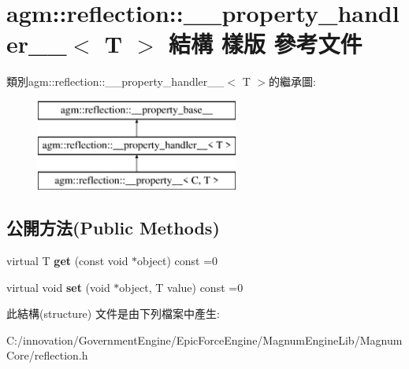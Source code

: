 \hypertarget{structagm_1_1reflection_1_1____property__handler____}{}\section{agm\+:\+:reflection\+:\+:\+\_\+\+\_\+property\+\_\+handler\+\_\+\+\_\+$<$ T $>$ 結構 樣版 參考文件}
\label{structagm_1_1reflection_1_1____property__handler____}
類別agm\+:\+:reflection\+:\+:\+\_\+\+\_\+property\+\_\+handler\+\_\+\+\_\+$<$ T $>$的繼承圖\+:\begin{figure}[H]
\begin{center}
\leavevmode
\includegraphics[height=3.000000cm]{structagm_1_1reflection_1_1____property__handler____}
\end{center}
\end{figure}
\subsection*{公開方法(Public Methods)}
\begin{DoxyCompactItemize}
\item 
virtual T {\bfseries get} (const void $\ast$object) const  =0\hypertarget{structagm_1_1reflection_1_1____property__handler_____afdd1f1c5c3ed851a885caaa1978a120d}{}\label{structagm_1_1reflection_1_1____property__handler_____afdd1f1c5c3ed851a885caaa1978a120d}

\item 
virtual void {\bfseries set} (void $\ast$object, T value) const  =0\hypertarget{structagm_1_1reflection_1_1____property__handler_____a0712da7ceda5915c74d0e142f8964c02}{}\label{structagm_1_1reflection_1_1____property__handler_____a0712da7ceda5915c74d0e142f8964c02}

\end{DoxyCompactItemize}


此結構(structure) 文件是由下列檔案中產生\+:\begin{DoxyCompactItemize}
\item 
C\+:/innovation/\+Government\+Engine/\+Epic\+Force\+Engine/\+Magnum\+Engine\+Lib/\+Magnum\+Core/reflection.\+h\end{DoxyCompactItemize}
